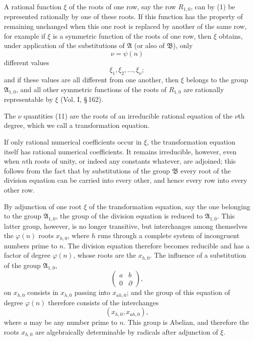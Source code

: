 \documentclass[11pt]{article}
\begin{document}
A rational function $\xi$ of the roots of one row, say the row $R_{1,0}$, can by (1) be
represented rationally by one of these roots. If this function has the property of remaining
unchanged when this one root is replaced by another of the same row, for example if $\xi$
is a symmetric function of the roots of one row, then $\xi$ obtains, under application of the
substitutions of $\mathfrak A$ (or also of $\mathfrak B$), only
\begin{equation}
 \nu=\psi(n)
\tag{10}
\end{equation}
different values
\begin{equation}
 \xi_1,\xi_2,\ldots,\xi_\nu;
\tag{11}
\end{equation}
and if these values are all different from one another, then $\xi$ belongs to the group
$\mathfrak A_{1,0}$, and all other symmetric functions of the roots of $R_{1,0}$ are rationally
representable by $\xi$ (Vol. I, \S\,162).

The $\nu$ quantities (11) are the roots of an irreducible rational equation of the $\nu$th
degree, which we call a transformation equation.

If only rational numerical coefficients occur in $\xi$, the transformation equation itself has
rational numerical coefficients. It remains irreducible, however, even when $n$th roots of
unity, or indeed any constants whatever, are adjoined; this follows from the fact that by
substitutions of the group $\mathfrak B$ every root of the division equation can be carried into
every other, and hence every row into every other row.

By adjunction of one root $\xi$ of the transformation equation, say the one belonging to the
group $\mathfrak A_{1,0}$, the group of the division equation is reduced to
$\mathfrak A_{1,0}$. This latter group, however, is no longer transitive, but interchanges
among themselves the $\varphi(n)$ roots $x_{h,0}$, where $h$ runs through a complete system of
incongruent numbers prime to $n$. The division equation therefore becomes reducible and
has a factor of degree $\varphi(n)$, whose roots are the $x_{h,0}$. The influence of a
substitution of the group $\mathfrak A_{1,0}$,
\[
 \begin{pmatrix}a&b\\0&\partial\end{pmatrix},
\]
on $x_{h,0}$ consists in $x_{h,0}$ passing into $x_{ah,0}$; and the group of this equation of
degree $\varphi(n)$ therefore consists of the interchanges
\[
 (x_{h,0},x_{ah,0}),
\]
where $a$ may be any number prime to $n$. This group is Abelian, and therefore the roots
$x_{h,0}$ are algebraically determinable by radicals after adjunction of $\xi$.
\end{document}
